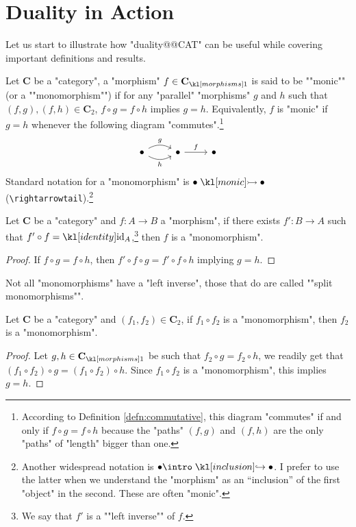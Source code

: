 \documentclass[main.tex]{subfiles}
\begin{document}
\section{Duality in Action}
Let us start to illustrate how "duality@@CAT" can be useful while covering important definitions and results.
\begin{defn}[Monomorphism]
	\AP Let $\mathbf{C}$ be a "category", a "morphism" $f \in \mor{\mathbf{C}}$ is said to be ""monic"" (or a ""monomorphism"") if for any "parallel" "morphisms" $g$ and $h$ such that $(f,g), (f,h) \in \mathbf{C}_2$, $f\circ g = f\circ h$ implies $g = h$. Equivalently, $f$ is "monic" if $g = h$ whenever the following diagram "commutes".\footnote{According to Definition \ref{defn:commutative}, this diagram "commutes" if and only if $f \circ g = f \circ h$ because the "paths" $(f,g)$ and $(f,h)$ are the only "paths" of "length" bigger than one.}
	\begin{equation}\label{diag:defmonic}
		\begin{tikzcd}
		\bullet \arrow[r, "h"', bend right] \arrow[r, "g", bend left] & \bullet \arrow[r, "f"] & \bullet
		\end{tikzcd}
	\end{equation}
	Standard notation for a "monomorphism" is $ \bullet \mono \bullet $ (\verb!\rightarrowtail!).\footnote{\AP Another widespread notation is $\bullet \intro\inclusion \bullet$. I prefer to use the latter when we understand the "morphism" as an ``inclusion'' of the first "object" in the second. These are often "monic".}
\end{defn}
\begin{prop}\label{prop:mon1}
	Let $\mathbf{C}$ be a "category" and $f:A\rightarrow B$ a "morphism", if there exists $f': B\rightarrow A$ such that $f'\circ f = \id_A$,\footnote{\AP We say that $f'$ is a ""left inverse"" of $f$.} then $f$ is a "monomorphism".
\end{prop}
\begin{proof}
	If $f\circ g = f\circ h$, then $f'\circ f \circ g = f'\circ f \circ h$ implying $g = h$.
\end{proof}
\AP Not all "monomorphisms" have a "left inverse", those that do are called ""split monomorphisms"".
\begin{prop}\label{prop:mon2}
	Let $\mathbf{C}$ be a "category" and $(f_1, f_2) \in \mathbf{C}_2$, if $f_1 \circ f_2$ is a "monomorphism", then $f_2$ is a "monomorphism".
\end{prop}
\begin{proof}
	Let $g,h \in \mor{\mathbf{C}}$ be such that $f_2\circ g = f_2\circ h$, we readily get that $(f_1\circ f_2)\circ g = (f_1 \circ f_2) \circ h$. Since $f_1\circ f_2$ is a "monomorphism", this implies $g = h$.
\end{proof}
\end{document}

